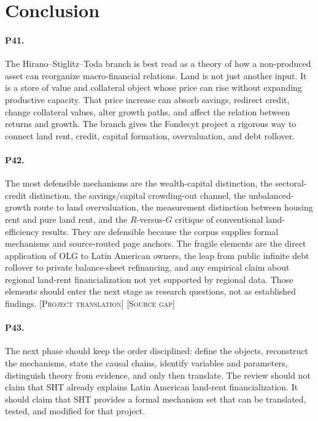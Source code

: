 \documentclass[11pt]{article}
\newcommand{\projecttranslation}{\textsc{[Project translation]}}
\newcommand{\sourcegap}{\textsc{[Source gap]}}
\newcommand{\SHT}{Hirano--Stiglitz--Toda}
\begin{document}
\section{Conclusion}

\paragraph{P41.} The \SHT{} branch is best read as a theory of how a non-produced asset can reorganize macro-financial relations. Land is not just another input. It is a store of value and collateral object whose price can rise without expanding productive capacity. That price increase can absorb savings, redirect credit, change collateral values, alter growth paths, and affect the relation between returns and growth. The branch gives the Fondecyt project a rigorous way to connect land rent, credit, capital formation, overvaluation, and debt rollover.

\paragraph{P42.} The most defensible mechanisms are the wealth-capital distinction, the sectoral-credit distinction, the savings/capital crowding-out channel, the unbalanced-growth route to land overvaluation, the measurement distinction between housing rent and pure land rent, and the \(R\)-versus-\(G\) critique of conventional land-efficiency results. They are defensible because the corpus supplies formal mechanisms and source-routed page anchors. The fragile elements are the direct application of OLG to Latin American owners, the leap from public infinite debt rollover to private balance-sheet refinancing, and any empirical claim about regional land-rent financialization not yet supported by regional data. Those elements should enter the next stage as research questions, not as established findings. \projecttranslation{} \sourcegap{}

\paragraph{P43.} The next phase should keep the order disciplined: define the objects, reconstruct the mechanisms, state the causal chains, identify variables and parameters, distinguish theory from evidence, and only then translate. The review should not claim that SHT already explains Latin American land-rent financialization. It should claim that SHT provides a formal mechanism set that can be translated, tested, and modified for that project.
\end{document}
